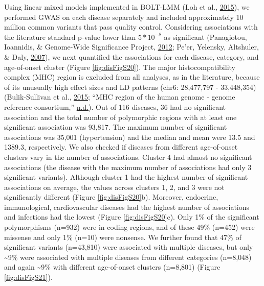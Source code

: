 \documentclass[12pt,twoside]{unicam}
\begin{document}
Using linear mixed models implemented in BOLT-LMM (Loh et al., \protect\hyperlink{ref-Loh2015}{2015}), we performed GWAS on each disease separately and included approximately 10 million common variants that pass quality control. Considering associations with the literature standard p-value lower than \(5*10^{-8}\) as significant (Panagiotou, Ioannidis, \& Genome-Wide Significance Project, \protect\hyperlink{ref-Panagiotou2012}{2012}; Pe'er, Yelensky, Altshuler, \& Daly, \protect\hyperlink{ref-Peer2007}{2007}), we next quantified the associations for each disease, category, and age-of-onset cluster (Figure \ref{fig:disFigS20}). The major histocompatibility complex (MHC) region is excluded from all analyses, as in the literature, because of its unusually high effect sizes and LD patterns (chr6: 28,477,797 - 33,448,354) (Bulik-Sullivan et al., \protect\hyperlink{ref-Bulik-Sullivan2015}{2015}; ``MHC region of the human genome - genome reference consortium,'' \protect\hyperlink{ref-mhc2020}{n.d.}). Out of 116 diseases, 36 had no significant association and the total number of polymorphic regions with at least one significant association was 93,817. The maximum number of significant associations was 35,001 (hypertension) and the median and mean were 13.5 and 1389.3, respectively. We also checked if diseases from different age-of-onset clusters vary in the number of associations. Cluster 4 had almost no significant associations (the disease with the maximum number of associations had only 3 significant variants). Although cluster 1 had the highest number of significant associations on average, the values across clusters 1, 2, and 3 were not significantly different (Figure \ref{fig:disFigS20}b). Moreover, endocrine, immunological, cardiovascular diseases had the highest number of associations and infections had the lowest (Figure \ref{fig:disFigS20}c). Only 1\% of the significant polymorphisms (n=932) were in coding regions, and of these 49\% (n=452) were missense and only 1\% (n=10) were nonsense. We further found that 47\% of significant variants (n=43,810) were associated with multiple diseases, but only \textasciitilde9\% were associated with multiple diseases from different categories (n=8,048) and again \textasciitilde9\% with different age-of-onset clusters (n=8,801) (Figure \ref{fig:disFigS21}).
\end{document}
